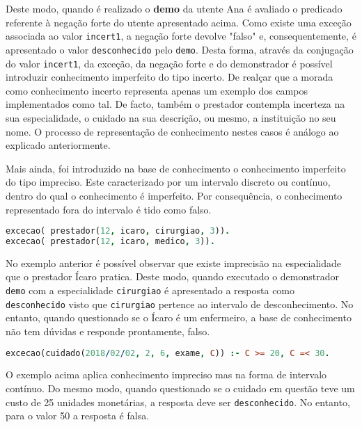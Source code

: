 \documentclass[a4paper]{article}
\begin{document}
Deste modo, quando é realizado o \textbf{demo} da utente Ana é avaliado o predicado referente à negação forte do utente apresentado acima. Como existe uma exceção associada ao valor \texttt{incert1}, a negação forte devolve "falso" e, consequentemente, é apresentado o valor \texttt{desconhecido} pelo \texttt{demo}. Desta forma, através da conjugação do valor \texttt{incert1}, da exceção, da negação forte e do demonstrador é possível introduzir conhecimento imperfeito do tipo incerto. De realçar que a morada como conhecimento incerto representa apenas um exemplo dos campos implementados como tal. De facto, também o prestador contempla incerteza na sua especialidade, o cuidado na sua descrição, ou mesmo, a instituição no seu nome. O processo de representação de conhecimento nestes casos é análogo ao explicado anteriormente.

Mais ainda, foi introduzido na base de conhecimento o conhecimento imperfeito do tipo impreciso. Este caracterizado por um intervalo discreto ou contínuo, dentro do qual o conhecimento é imperfeito. Por consequência, o conhecimento representado fora do intervalo é tido como falso.

\begin{lstlisting}[language=Prolog, caption=Exemplo de conhecimento imperfeito do tipo impreciso num intervalo discreto.]
excecao( prestador(12, icaro, cirurgiao, 3)).
excecao( prestador(12, icaro, medico, 3)).
\end{lstlisting}

No exemplo anterior é possível observar que existe imprecisão na especialidade que o prestador Ícaro pratica. Deste modo, quando executado o demonstrador \texttt{demo} com a especialidade \texttt{cirurgiao} é apresentado a resposta como \texttt{desconhecido} visto que \texttt{cirurgiao} pertence ao intervalo de desconhecimento. No entanto, quando questionado se o Ícaro é um enfermeiro, a base de conhecimento não tem dúvidas e responde prontamente, falso.

\begin{lstlisting}[language=Prolog, caption=Exemplo de conhecimento imperfeito do tipo impreciso num intervalo contínuo.]
excecao(cuidado(2018/02/02, 2, 6, exame, C)) :- C >= 20, C =< 30.
\end{lstlisting}

O exemplo acima aplica conhecimento impreciso mas na forma de intervalo contínuo. Do mesmo modo, quando questionado se o cuidado em questão teve um custo de 25 unidades monetárias, a resposta deve ser \texttt{desconhecido}. No entanto, para o valor 50 a resposta é falsa.
\end{document}

